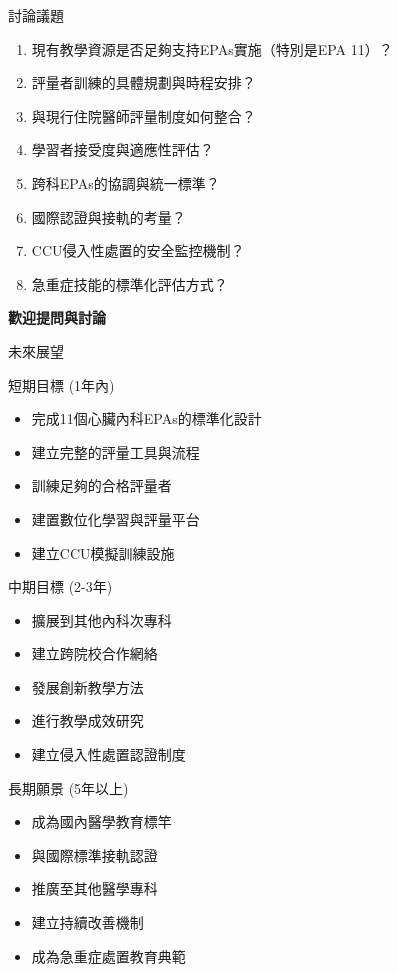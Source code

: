 \documentclass[aspectratio=169]{beamer}
\begin{document}
\begin{frame}{討論議題}
\begin{enumerate}
\item 現有教學資源是否足夠支持EPAs實施（特別是EPA 11）？
\item 評量者訓練的具體規劃與時程安排？
\item 與現行住院醫師評量制度如何整合？
\item 學習者接受度與適應性評估？
\item 跨科EPAs的協調與統一標準？
\item 國際認證與接軌的考量？
\item \textcolor{emergency_red}{CCU侵入性處置的安全監控機制？}
\item \textcolor{emergency_red}{急重症技能的標準化評估方式？}
\end{enumerate}

\vspace{1cm}
\begin{center}
\Large{\textcolor{emergency_blue}{\textbf{歡迎提問與討論}}}
\end{center}
\end{frame}

\begin{frame}{未來展望}
\begin{alertblock}{短期目標 (1年內)}
\begin{itemize}
\item 完成11個心臟內科EPAs的標準化設計
\item 建立完整的評量工具與流程
\item 訓練足夠的合格評量者
\item 建置數位化學習與評量平台
\item \textcolor{emergency_red}{建立CCU模擬訓練設施}
\end{itemize}
\end{alertblock}

\begin{block}{中期目標 (2-3年)}
\begin{itemize}
\item 擴展到其他內科次專科
\item 建立跨院校合作網絡
\item 發展創新教學方法
\item 進行教學成效研究
\item \textcolor{emergency_red}{建立侵入性處置認證制度}
\end{itemize}
\end{block}

\begin{exampleblock}{長期願景 (5年以上)}
\begin{itemize}
\item 成為國內醫學教育標竿
\item 與國際標準接軌認證
\item 推廣至其他醫學專科
\item 建立持續改善機制
\item \textcolor{emergency_red}{成為急重症處置教育典範}
\end{itemize}
\end{exampleblock}
\end{frame}
\end{document}
